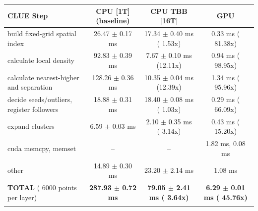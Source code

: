     \begin{tabular}{l|c|c|c}
    \hline
    CLUE Step                                 & CPU [1T] (baseline)         & CPU TBB [16T]                         & GPU                       \\ \hline
    build fixed-grid spatial index            &  26.47 $\pm$  0.17 ms       &  17.34 $\pm$  0.40 ms ( 1.53x)        &   0.33 ms ( 81.38x)       \\
    calculate local density                   &  92.83 $\pm$  0.39 ms       &   7.67 $\pm$  0.10 ms (12.11x)        &   0.94 ms ( 98.95x)       \\
    calculate nearest-higher and separation   & 128.26 $\pm$  0.36 ms       &  10.35 $\pm$  0.04 ms (12.39x)        &   1.34 ms ( 95.96x)       \\
    decide seeds/outliers, register followers &  18.88 $\pm$  0.31 ms       &  18.40 $\pm$  0.08 ms ( 1.03x)        &   0.29 ms ( 66.09x)       \\
    expand clusters                           &   6.59 $\pm$  0.03 ms       &   2.10 $\pm$  0.35 ms ( 3.14x)        &   0.43 ms ( 15.20x)       \\ \hline
    cuda memcpy, memset                       & --                          & --                                    &   1.82 ms,   0.08 ms      \\
    other                                     &  14.89 $\pm$  0.30 ms       &  23.20 $\pm$  2.14 ms                 &   1.08 ms                 \\ \hline
    \textbf{TOTAL} ( 6000 points per layer)   & \textbf{287.93 $\pm$  0.72 ms} & \textbf{ 79.05 $\pm$  2.41 ms ( 3.64x)} & \textbf{  6.29 $\pm$  0.01 ms ( 45.76x)}  \\
    \hline
    \multicolumn{4}{c}{}
    \end{tabular}
    \linebreak


